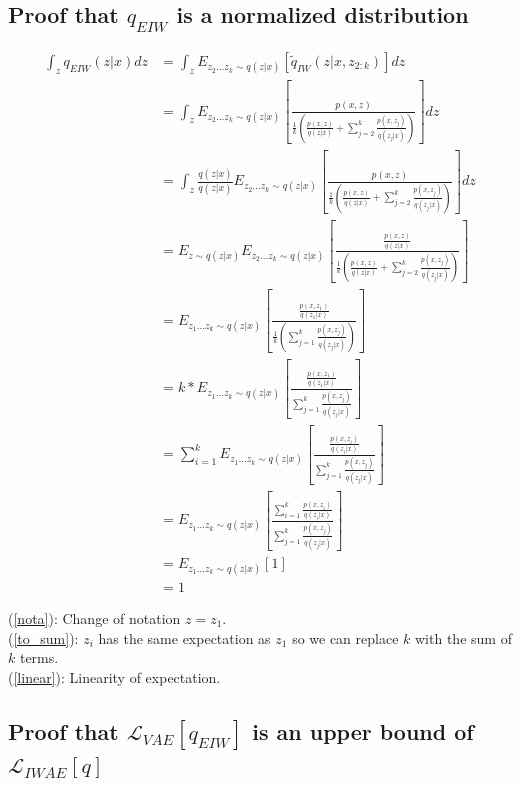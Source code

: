 \documentclass{article} %
\begin{document}
\subsection{Proof that \texorpdfstring{$q_{EIW}$}{} is a normalized distribution}
\label{proof_norm}

\begin{align} 
    \int_z q_{EIW}(z|x) dz
    &= \int_z E_{z_{2}...z_{k} \sim q(z|x)} \left[ \tilde{q}_{IW}(z|x,z_{2:k}) \right] dz \\
    &= \int_z E_{z_{2}...z_{k} \sim q(z|x)} \left[ \frac{p(x,z)}{  \frac{1}{k} \left( \frac{p(x,z)}{q(z|x)}+ \sum_{j=2}^k \frac{p(x,z_j)}{q(z_j|x)} \right) } \right] dz\\
    &= \int_z \frac{q(z|x)}{q(z|x)}E_{z_{2}...z_{k} \sim q(z|x)} \left[ \frac{p(x,z)}{  \frac{1}{k} \left( \frac{p(x,z)}{q(z|x)}+ \sum_{j=2}^k \frac{p(x,z_j)}{q(z_j|x)} \right) } \right] dz\\
    &= E_{z \sim q(z|x)} E_{z_{2}...z_{k} \sim q(z|x)} \left[ \frac{\frac{p(x,z)}{q(z|x)}}{  \frac{1}{k} \left( \frac{p(x,z)}{q(z|x)}+ \sum_{j=2}^k \frac{p(x,z_j)}{q(z_j|x)} \right) } \right] \\
    &= E_{z_{1}...z_{k} \sim q(z|x)} \left[ \frac{\frac{p(x,z_1)}{q(z_1|x)}}{  \frac{1}{k} \left( \sum_{j=1}^k \frac{p(x,z_j)}{q(z_j|x)} \right) } \right] \label{nota} \\
    &= k*E_{z_{1}...z_{k} \sim q(z|x)} \left[ \frac{\frac{p(x,z_1)}{q(z_1|x)}}{   \sum_{j=1}^k \frac{p(x,z_j)}{q(z_j|x)}  } \right]\\
    &= \sum_{i=1}^{k} E_{z_{1}...z_{k} \sim q(z|x)} \left[ \frac{\frac{p(x,z_i)}{q(z_i|x)}}{   \sum_{j=1}^k \frac{p(x,z_j)}{q(z_j|x)}  } \right] \label{to_sum} \\
    &= E_{z_{1}...z_{k} \sim q(z|x)} \left[ \frac{\sum_{i=1}^k \frac{p(x,z_i)}{q(z_i|x)}}{   \sum_{j=1}^k \frac{p(x,z_j)}{q(z_j|x)}  } \right] \label{linear} \\
    &= E_{z_{1}...z_{k} \sim q(z|x)} \left[1 \right] \\
    &= 1
\end{align}


(\ref{nota}): Change of notation $z = z_1$. \\
(\ref{to_sum}): $z_i$ has the same expectation as $z_1$ so we can replace $k$ with the sum of $k$ terms. \\
(\ref{linear}): Linearity of expectation.

\newpage

\subsection{Proof that \texorpdfstring{$\mathcal{L}_{VAE}[q_{EIW}]$}{} is an upper bound of \texorpdfstring{$\mathcal{L}_{IWAE}[q]$}{}}
\label{qeiw_proof}
\end{document}
